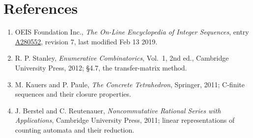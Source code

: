 \documentclass[11pt]{article}
\theoremstyle{definition}
\begin{document}
\section{References}

\begin{enumerate}

\item OEIS Foundation Inc., \emph{The On-Line Encyclopedia of Integer Sequences}, entry \href{https://oeis.org/A280552}{A280552}, revision 7, last modified Feb 13 2019.

\item R. P. Stanley, \emph{Enumerative Combinatorics}, Vol.~1, 2nd ed., Cambridge University Press, 2012; \S4.7, the transfer-matrix method.

\item M. Kauers and P. Paule, \emph{The Concrete Tetrahedron}, Springer, 2011; C-finite sequences and their closure properties.

\item J. Berstel and C. Reutenauer, \emph{Noncommutative Rational Series with Applications}, Cambridge University Press, 2011; linear representations of counting automata and their reduction.

\end{enumerate}
\end{document}
